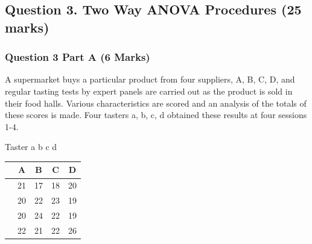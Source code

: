 \documentclass[a4paper,12pt]{article}
\begin{document}
\newpage
\subsection*{Question 3. Two Way ANOVA Procedures (25 marks) }
\subsubsection*{Question 3 Part A (6 Marks)}
 A supermarket buys a particular product from four suppliers, A, B, C, D, and regular tasting tests by expert panels 
are carried out as the product is sold in their food halls. 
Various characteristics are scored and an analysis of the totals of these scores is made. 
Four tasters a, b, c, d obtained these results at four sessions 1-4.

Taster a b c d
\begin{tabular}{|c|c|c|c|c|}\hline 
&	A  & B  & C & D \\ \hline
	\hline  
	
&   21 & 17 & 18 & 20 \\
	
&	20 & 22 & 23 & 19 \\
	
&	20 & 24 & 22 & 19 \\
	
&	22 & 21 & 22 & 26 \\
	
	\hline 
\end{tabular} 
\end{document}
